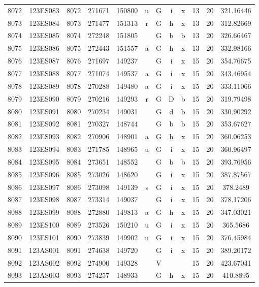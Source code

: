 \begin{tabular}{|*{12}{c|}}
8072 & 123ES083 & 8072 & 271671 & 150800 & u & G & i & x & 13 & 20 & 321.16446 \\ 
8073 & 123ES084 & 8073 & 271477 & 151313 & r & G & h & x & 13 & 20 & 312.82669 \\ 
8074 & 123ES085 & 8074 & 272248 & 151805 &  & G & b & b & 13 & 20 & 326.66467 \\ 
8075 & 123ES086 & 8075 & 272443 & 151557 & a & G & h & x & 13 & 20 & 332.98166 \\ 
8076 & 123ES087 & 8076 & 271697 & 149237 &  & G & i & x & 15 & 20 & 354.76675 \\ 
8077 & 123ES088 & 8077 & 271074 & 149537 & a & G & i & x & 15 & 20 & 343.46954 \\ 
8078 & 123ES089 & 8078 & 270288 & 149480 & a & G & i & x & 15 & 20 & 333.11066 \\ 
8079 & 123ES090 & 8079 & 270216 & 149293 & r & G & D & b & 15 & 20 & 319.79498 \\ 
8080 & 123ES091 & 8080 & 270234 & 149031 &  & G & d & b & 15 & 20 & 330.90292 \\ 
8081 & 123ES092 & 8081 & 270327 & 148744 &  & G & b & b & 15 & 20 & 353.67627 \\ 
8082 & 123ES093 & 8082 & 270906 & 148901 & a & G & h & x & 15 & 20 & 360.06253 \\ 
8083 & 123ES094 & 8083 & 271785 & 148965 & u & G & i & x & 15 & 20 & 360.96497 \\ 
8084 & 123ES095 & 8084 & 273651 & 148552 &  & G & b & b & 15 & 20 & 393.76956 \\ 
8085 & 123ES096 & 8085 & 273026 & 148620 &  & G & i & x & 15 & 20 & 387.87567 \\ 
8086 & 123ES097 & 8086 & 273098 & 149139 & s & G & i & x & 15 & 20 & 378.2489 \\ 
8087 & 123ES098 & 8087 & 273314 & 149037 &  & G & i & x & 15 & 20 & 378.17206 \\ 
8088 & 123ES099 & 8088 & 272880 & 149813 & a & G & h & x & 15 & 20 & 347.03021 \\ 
8089 & 123ES100 & 8089 & 273526 & 150210 & u & G & i & x & 15 & 20 & 365.5686 \\ 
8090 & 123ES101 & 8090 & 273839 & 149902 & u & G & i & x & 15 & 20 & 376.45984 \\ 
8091 & 123AS001 & 8091 & 274638 & 149720 &  & G & i & x & 15 & 20 & 389.20172 \\ 
8092 & 123AS002 & 8092 & 274900 & 149328 &  & V &  &  & 15 & 20 & 423.67041 \\ 
8093 & 123AS003 & 8093 & 274257 & 148933 &  & G & h & x & 15 & 20 & 410.8895 \\ 

\end{tabular}
